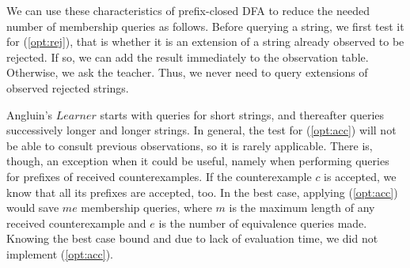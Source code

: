 We can use these characteristics of prefix-closed DFA to reduce the
needed number of membership queries as follows. Before querying a
string, we first test it for (\ref{opt:rej}), that is whether it is an
extension of a string already observed to be rejected. If so, we can
add the result immediately to the observation table. Otherwise, we ask
the teacher. Thus, we never need to query extensions of observed
rejected strings.

Angluin's $Learner$ starts with queries for short strings, and
thereafter queries successively longer and longer strings. In general,
the test for (\ref{opt:acc}) will not be able to consult previous
observations, so it is rarely applicable. There is, though, an
exception when it could be useful, namely when performing queries for
prefixes of received counterexamples. If the counterexample $c$ is
accepted, we know that all its prefixes are accepted, too. In the best
case, applying (\ref{opt:acc}) would save $m e$ membership queries,
where $m$ is the maximum length of any received counterexample and $e$
is the number of equivalence queries made. Knowing the best case
bound and due to lack of evaluation time, we did not implement (\ref{opt:acc}).

